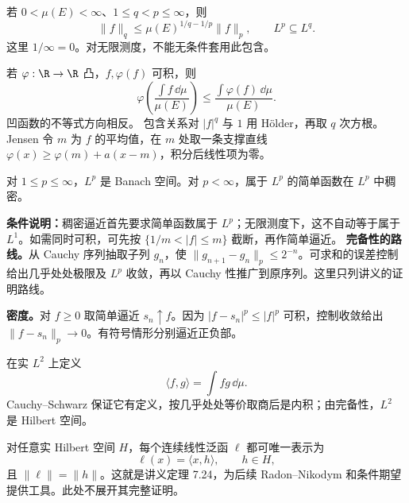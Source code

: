 若 $0<\mu(E)<\infty$、$1\le q<p\le\infty$，则
\[
\|f\|_q\le\mu(E)^{1/q-1/p}\|f\|_p,
\qquad L^p\subseteq L^q.
\]
这里 $1/\infty=0$。对无限测度，不能无条件套用此包含。

若 $\varphi:\R\to\R$ 凸，$f,\varphi(f)$ 可积，则
\[
\varphi\left(\frac{\int f\,\dd\mu}{\mu(E)}\right)
\le\frac{\int\varphi(f)\,\dd\mu}{\mu(E)}.
\]
凹函数的不等式方向相反。
包含关系对 $|f|^q$ 与 $1$ 用 Hölder，再取 $q$ 次方根。Jensen 令 $m$ 为 $f$ 的平均值，在 $m$ 处取一条支撑直线 $\varphi(x)\ge\varphi(m)+a(x-m)$，积分后线性项为零。

对 $1\le p\le\infty$，$L^p$ 是 Banach 空间。对 $p<\infty$，属于 $L^p$ 的简单函数在 $L^p$ 中稠密。

\textbf{条件说明：}稠密逼近首先要求简单函数属于 $L^p$；无限测度下，这不自动等于属于 $L^1$。如需同时可积，可先按 $\{1/m<|f|\le m\}$ 截断，再作简单逼近。
\textbf{完备性的路线。}从 Cauchy 序列抽取子列 $g_n$，使 $\|g_{n+1}-g_n\|_p\le2^{-n}$。可求和的误差控制给出几乎处处极限及 $L^p$ 收敛，再以 Cauchy 性推广到原序列。这里只列讲义的证明路线。

\textbf{密度。}对 $f\ge0$ 取简单逼近 $s_n\uparrow f$。因为 $|f-s_n|^p\le|f|^p$ 可积，控制收敛给出 $\|f-s_n\|_p\to0$。有符号情形分别逼近正负部。

在实 $L^2$ 上定义
\[
\langle f,g\rangle=\int fg\,\dd\mu.
\]
Cauchy–Schwarz 保证它有定义，按几乎处处等价取商后是内积；由完备性，$L^2$ 是 Hilbert 空间。

对任意实 Hilbert 空间 $H$，每个连续线性泛函 $\ell$ 都可唯一表示为
\[
\ell(x)=\langle x,h\rangle,\qquad h\in H,
\]
且 $\|\ell\|=\|h\|$。这就是讲义定理 7.24，为后续 Radon–Nikodym 和条件期望提供工具。此处不展开其完整证明。
